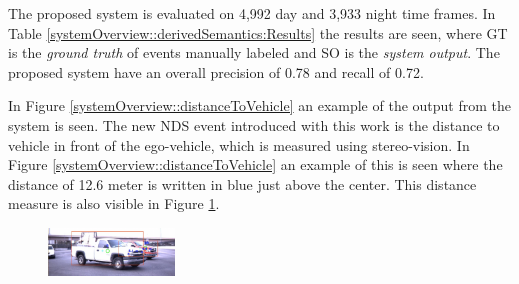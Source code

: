 \begin{multicols}{2}   
The proposed system is evaluated on 4,992 day and 3,933 night time frames. In Table \ref{systemOverview::derivedSemantics:Results} the results are seen, where GT is the \textit{ground truth} of events manually labeled and SO is the \textit{system output}. The proposed system have an overall precision of 0.78 and recall of 0.72.
\begin{center}
\end{center}
In Figure \ref{systemOverview::distanceToVehicle} an example of the output from the system is seen. %
The new NDS event introduced with this work is the distance to vehicle in front of the ego-vehicle, which is measured using stereo-vision. In Figure \ref{systemOverview::distanceToVehicle} an example of this is seen where the distance of 12.6 meter is written in blue just above the center. This distance measure is also visible in Figure \ref{systemOverview::occludedVehicleDetected}.
\begin{figure}[H]
  \centering
  \includegraphics[width=0.3\textwidth]{text/figures/lefttrun2cars.png}
  \label{systemOverview::occludedVehicleDetected}
\end{figure}


\end{multicols}
